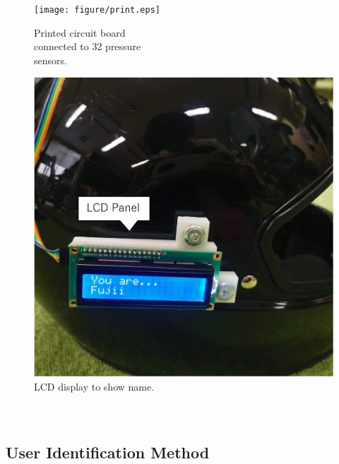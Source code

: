 \documentclass[english,preprint,JIP]{ipsj}
\begin{document}
\begin{figure}[!t]
\begin{minipage}{0.48\hsize}
  \begin{center}
    \texttt{[image: figure/print.eps]}
  \end{center}
  \caption{Printed circuit board\\connected to 32 pressure\\sensors.}
  \label{fig:print}
  \end{minipage}
\begin{minipage}{0.47\hsize}
  \begin{center}
    \includegraphics[width=1\linewidth]{figure/lcd.eps}
  \end{center}
  \caption{LCD display to show name.\\~\\~}
  \label{fig:lcd}
  \end{minipage}
\end{figure}


\subsection{User Identification Method}


\end{document}

